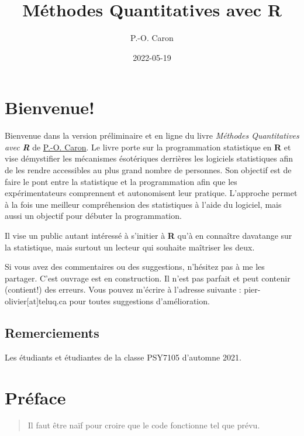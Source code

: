 \documentclass[
]{book}
\title{Méthodes Quantitatives avec R}
\author{P.-O. Caron}
\date{2022-05-19}
\begin{document}
\maketitle

{
\setcounter{tocdepth}{1}
\tableofcontents
}
\hypertarget{bienvenue}{%
\chapter*{Bienvenue!}\label{bienvenue}}

Bienvenue dans la version préliminaire et en ligne du livre \emph{Méthodes Quantitatives avec }\textbf{\emph{R}} de \href{https://www.teluq.ca/siteweb/univ/pcaron.html}{P.-O. Caron}. Le livre porte sur la programmation statistique en \textbf{R} et vise démystifier les mécanismes ésotériques derrières les logiciels statistiques afin de les rendre accessibles au plus grand nombre de personnes. Son objectif est de faire le pont entre la statistique et la programmation afin que les expérimentateurs comprennent et autonomisent leur pratique. L'approche permet à la fois une meilleur compréhension des statistiques à l'aide du logiciel, mais aussi un objectif pour débuter la programmation.

Il vise un public autant intéressé à s'initier à \textbf{R} qu'à en connaître davatange sur la statistique, mais surtout un lecteur qui souhaite maîtriser les deux.

Si vous avez des commentaires ou des suggestions, n'hésitez pas à me les partager. C'est ouvrage est en construction. Il n'est pas parfait et peut contenir (contient!) des erreurs. Vous pouvez m'écrire à l'adresse suivante : pier-olivier{[}at{]}teluq.ca pour toutes suggestions d'amélioration.

\hypertarget{remerciements}{%
\section*{Remerciements}\label{remerciements}}

Les étudiants et étudiantes de la classe PSY7105 d'automne 2021.

\hypertarget{pruxe9face}{%
\chapter*{Préface}\label{pruxe9face}}

\begin{quote}
Il faut être naïf pour croire que le code fonctionne tel que prévu.
\end{quote}
\end{document}
